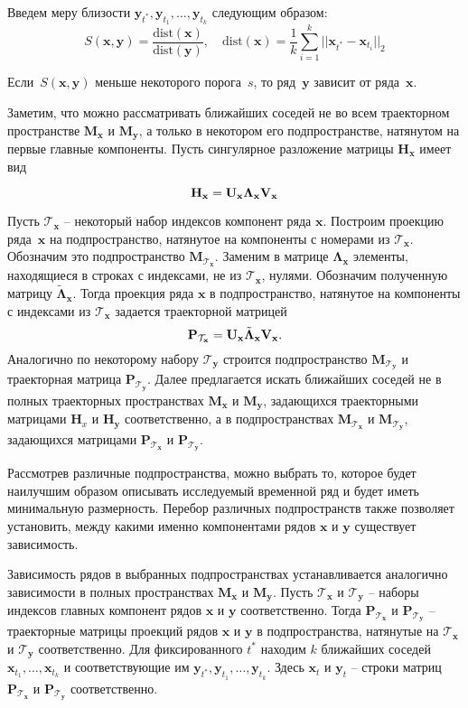 \documentclass[14pt]{article}
\newcommand{\bH}{\mathbf{H}}
\newcommand{\bM}{\mathbf{M}}
\newcommand{\bP}{\mathbf{P}}
\newcommand{\bx}{\mathbf{x}}
\newcommand{\by}{\mathbf{y}}
\begin{document}
Введем меру близости $\by_{t^*}, \by_{t_1}, \ldots, \by_{t_k}$ следующим образом:
$$S(\bx, \by) = \dfrac{\text{dist}(\bx)}{\text{dist}(\by)}, \quad 
\text{dist}(\bx) = \frac{1}{k}\sum_{i = 1}^{k}{||\bx_{t^*} - \bx_{t_i}||_2}$$

Если~$S(\bx, \by)$ меньше некоторого порога~$s$, то ряд~$\by$ зависит от ряда~$\bx$.

Заметим, что можно рассматривать ближайших соседей не во всем траекторном пространстве $\bM_{\bx}$ и $\bM_{\by}$, а только в некотором его подпространстве, натянутом на первые главные компоненты. Пусть сингулярное разложение матрицы $\bH_{\bx}$ имеет вид
\newcommand{\bV}{\bold{V}}
\newcommand{\bU}{\bold{U}}
\newcommand{\bLambda}{\mathbf{\Lambda}}
\newcommand{\cT}{\mathcal{T}}

$$\bH_{\bx} = \bU_{\bx}\bLambda_{\bx}\bV_{\bx}$$

Пусть $\cT_{\bx}$ -- некоторый набор индексов компонент ряда $\bx$.
Построим проекцию ряда~$\bx$ на подпространство, натянутое на компоненты с номерами из $\mathcal{T}_{\bx}$. Обозначим это подпространство $\bM_{\cT_{\bx}}$.
Заменим в матрице $\bLambda_{\bx}$ элементы, находящиеся в строках с 
индексами, не из $\cT_{\bx}$, нулями. Обозначим полученную матрицу $\tilde{\bLambda}_{\bx}$.
Тогда проекция ряда $\bx$ в подпространство, натянутое на компоненты с индексами из $\cT_{\bx}$ задается траекторной матрицей
$$\bP_{\cT_{\bx}} = \bU_{\bx}\tilde{\bLambda}_{\bx}\bV_{\bx}.$$
Аналогично по некоторому набору $\cT_{\by}$ строится подпространство $\bM_{\cT_{\by}}$ и траекторная матрица $\bP_{\cT_{\by}}$. 
Далее предлагается искать ближайших соседей не в полных траекторных пространствах $\bM_{\bx}$ и $\bM_{\by}$, задающихся траекторными матрицами $\bH_{x}$ и $\bH_{\by}$ соответственно, а в подпространствах $\bM_{\cT_{\bx}}$ и $\bM_{\cT_{\by}}$, задающихся матрицами $\bP_{\cT_{\bx}}$ и $\bP_{\cT_{\by}}$. 

Рассмотрев различные подпространства, можно выбрать то, которое будет наилучшим образом описывать исследуемый временной ряд и  будет иметь минимальную размерность.  Перебор различных подпространств также позволяет установить, между какими именно компонентами рядов $\bx$ и $\by$ существует зависимость. 

Зависимость рядов в выбранных подпространствах устанавливается аналогично зависимости в полных пространствах $\bM_{\bx}$ и $\bM_{\by}$.  
Пусть $\cT_{\bx}$ и $\cT_{\by}$ -- наборы индексов главных компонент рядов  $\bx$ и $\by$ соответственно.
Тогда $\bP_{\cT_{\bx}}$ и $\bP_{\cT_{\by}}$ -- траекторные матрицы проекций рядов $\bx$ и $\by$ в подпространства, натянутые на $\cT_{\bx}$ и $\cT_{\by}$ соответственно. 
Для фиксированного $t^*$ находим $k$ ближайших соседей $\bx_{t_1}, \ldots, \bx_{t_k}$ и соответствующие им $\by_{t^*}, \by_{t_1}, \ldots, \by_{t_k}$. Здесь $\bx_{t}$ и $\by_{t}$ -- строки матриц $\bP_{\cT_{\bx}}$ и $\bP_{\cT_{\by}}$ соответственно. 
\end{document}
